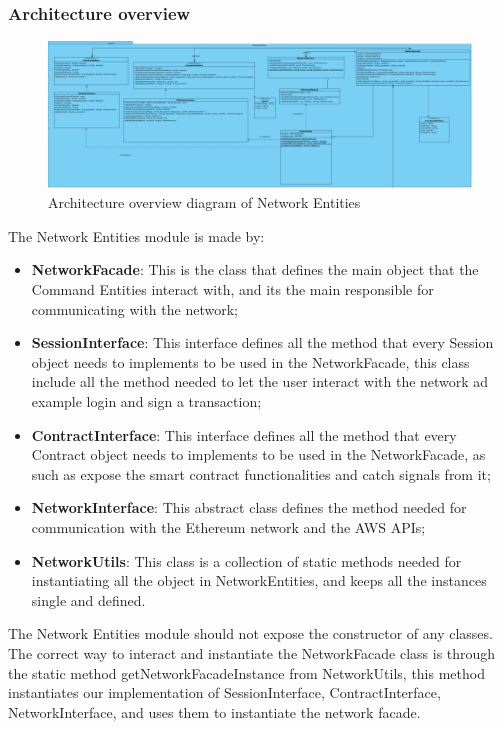 \subsubsection{Architecture overview}
\begin{figure}[h]
	\centering
	\includegraphics[width=\textwidth]{./res/img/NetworkFacade.png}
	\caption{Architecture overview diagram of Network Entities}
\end{figure}
The Network Entities module is made by:
\begin{itemize}
    \item \textbf{NetworkFacade}: This is the class that defines the main object that the Command Entities interact with, and its the main responsible for communicating with the network;
    \item \textbf{SessionInterface}: This interface defines all the method that every Session object needs to implements to be used in the NetworkFacade, this class include all the method needed to let the user interact with the network ad example login and sign a transaction;
    \item \textbf{ContractInterface}: This interface defines all the method that every Contract object needs to implements to be used in the NetworkFacade, as such as expose the smart contract functionalities and catch signals from it;
    \item \textbf{NetworkInterface}: This abstract class defines the method needed for communication with the Ethereum network and the AWS APIs;
    \item \textbf{NetworkUtils}: This class is a collection of static methods needed for instantiating all the object in NetworkEntities, and keeps all the instances single and defined.
\end{itemize}
The Network Entities module should not expose the constructor of any classes.
The correct way to interact and instantiate the NetworkFacade class is through the static method getNetworkFacadeInstance from NetworkUtils,
this method instantiates our implementation of SessionInterface, ContractInterface, NetworkInterface, and uses them to instantiate the network facade.

